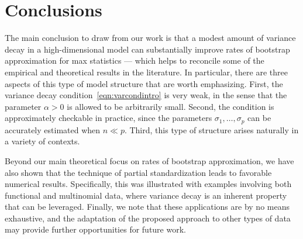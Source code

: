 \documentclass[aos,preprint]{imsart}
\numberwithin{equation}{section}
\theoremstyle{plain}
\newcommand{\1}{{\bf{1}}}
\newcommand{\0}{\mathbf{0}}
\def\references{}
\begin{document}
\section{Conclusions}\label{sec:conc}


The main conclusion to draw from our work is that a modest amount of variance decay in a high-dimensional model can substantially improve rates of bootstrap approximation for max statistics --- which helps to reconcile some of the empirical and theoretical results in the literature. In particular, there are three aspects of this type of model structure that are worth emphasizing. First, the variance decay condition~\eqref{eqn:varcondintro} is very weak, in the sense that the parameter $\alpha>0$ is allowed to be arbitrarily small. Second, the condition is approximately checkable in practice, since the parameters $\sigma_1,\dots,\sigma_p$ can be accurately estimated when $n\ll p$. Third, this type of structure arises naturally in a variety of contexts.

Beyond our main theoretical focus on rates of bootstrap approximation, we have also shown that the technique of partial standardization leads to favorable numerical results. Specifically, this was illustrated with examples involving both functional and multinomial data, where variance decay is an inherent property that can be leveraged. 
Finally, we note that these applications are by no means exhaustive, and the adaptation of the proposed approach to other types of data may provide further opportunities for future work.


\references
\end{document}
